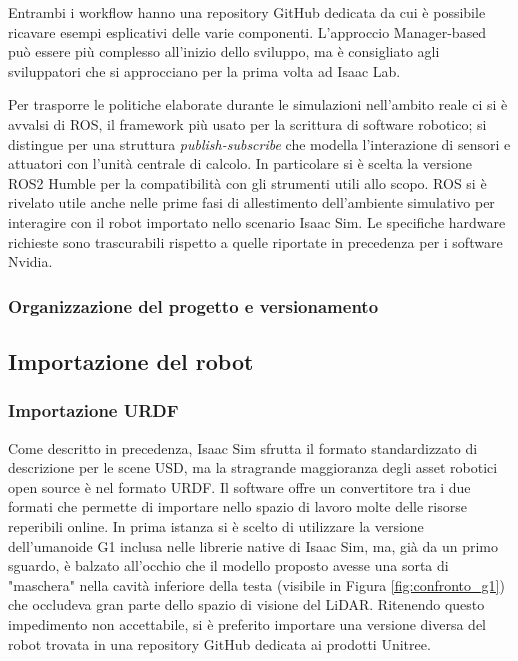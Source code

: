 Entrambi i workflow hanno una repository GitHub dedicata da cui è possibile ricavare esempi esplicativi delle varie componenti. L'approccio Manager-based può essere più complesso all'inizio dello sviluppo, ma è consigliato agli sviluppatori che si approcciano per la prima volta ad Isaac Lab.

Per trasporre le politiche elaborate durante le simulazioni nell'ambito reale ci si è avvalsi di ROS, il framework più usato per la scrittura di software robotico; si distingue per una struttura \textit{publish-subscribe} che modella l'interazione di sensori e attuatori con l'unità centrale di calcolo. In particolare si è scelta la versione ROS2 Humble per la compatibilità con gli strumenti utili allo scopo. ROS si è rivelato utile anche nelle prime fasi di allestimento dell'ambiente simulativo per interagire con il robot importato nello scenario Isaac Sim. Le specifiche hardware richieste sono trascurabili rispetto a quelle riportate in precedenza per i software Nvidia.

\subsubsection{Organizzazione del progetto e versionamento}




\subsection{Importazione del robot}

\subsubsection{Importazione URDF}
Come descritto in precedenza, Isaac Sim sfrutta il formato standardizzato di descrizione per le scene USD, ma la stragrande maggioranza degli asset robotici open source è nel formato URDF. Il software offre un convertitore tra i due formati che permette di importare nello spazio di lavoro molte delle risorse reperibili online. In prima istanza si è scelto di utilizzare la versione dell'umanoide G1 inclusa nelle librerie native di Isaac Sim, ma, già da un primo sguardo, è balzato all'occhio che il modello proposto avesse una sorta di "maschera" nella cavità inferiore della testa (visibile in Figura \ref{fig:confronto_g1}) che occludeva gran parte dello spazio di visione del LiDAR. Ritenendo questo impedimento non accettabile, si è preferito importare una versione diversa del robot trovata in una repository GitHub dedicata ai prodotti Unitree. 

